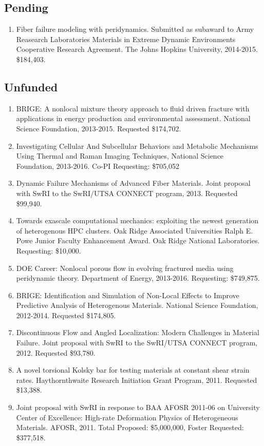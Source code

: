 \subsection*{Pending}

\begin{enumerate}
     \item Fiber failure modeling with peridynamics. Submitted as subaward to Army Reasearch Laboratories Materials in Extreme Dynamic Environments Cooperative Research Agreement.  The Johns Hopkins University, 2014-2015.  \$184,403.
\end{enumerate}

\subsection*{Unfunded}

\begin{enumerate}
    \item BRIGE: A nonlocal mixture theory approach to fluid driven fracture with applications in energy production and environmental assessment. National Science Foundation, 2013-2015. Requested \$174,702.
    \item  Investigating Cellular And Subcellular Behaviors and Metabolic Mechanisms Using Thermal and Raman Imaging Techniques, National Science Foundation, 2013-2016.  Co-PI Requesting: \$705,052
    \item Dynamic Failure Mechanisms of Advanced Fiber Materials. Joint proposal with SwRI to the SwRI/UTSA CONNECT program, 2013. Requested \$99,940.
  \item Towards exascale computational mechanics: exploiting the newest generation of heterogenous HPC clusters. Oak Ridge Associated Universities Ralph E. Powe Junior Faculty Enhancement Award. Oak Ridge National Laboratories. Requesting: \$10,000. 
    \item DOE Career: Nonlocal porous flow in evolving fractured media using peridynamic theory. Department of Energy, 2013-2016. Requesting: \$749,875. 
    \item BRIGE: Identification and Simulation of Non-Local Effects to Improve Predictive Analysis of Heterogenous Materials. National Science Foundation, 2012-2014. Requested \$174,805.
    \item Discontinuous Flow and Angled Localization: Modern Challenges in Material Failure. Joint proposal with SwRI to the SwRI/UTSA CONNECT program, 2012. Requested \$93,780.
    \item A novel torsional Kolsky bar for testing materials at constant shear strain rates. Haythornthwaite Research Initiation Grant Program, 2011. Requested \$13,388.
    \item Joint proposal with SwRI in response to BAA AFOSR 2011-06 on University Center of Excellence: High-rate Deformation Physics of Heterogeneous Materials. AFOSR, 2011. Total Proposed: \$5,000,000, Foster Requested: \$377,518.
\end{enumerate}
